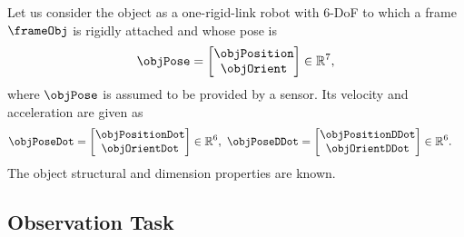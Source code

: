 
Let us consider the object as a one-rigid-link robot with 6-DoF to which a frame $\frameObj$ is rigidly attached and whose pose is 
\begin{equation}\label{eq:object pose}
	\objPose=\begin{bmatrix}
		\objPosition \\ \objOrient
	\end{bmatrix}\in \mathbb{R}^7,
\end{equation}
where $\objPose$ is assumed to be provided by a sensor. 
Its velocity and acceleration are given as 
\begin{align}\label{eq:obj vel and acc}
	\objPoseDot&=\begin{bmatrix}
		\objPositionDot \\ \objOrientDot
	\end{bmatrix}\in \mathbb{R}^6, \
	\objPoseDDot=\begin{bmatrix}
		\objPositionDDot \\ \objOrientDDot
	\end{bmatrix}\in \mathbb{R}^6.
\end{align}
The object structural and dimension properties are known.

\subsection{Observation Task}\label{subsec-chap4:observation task}


